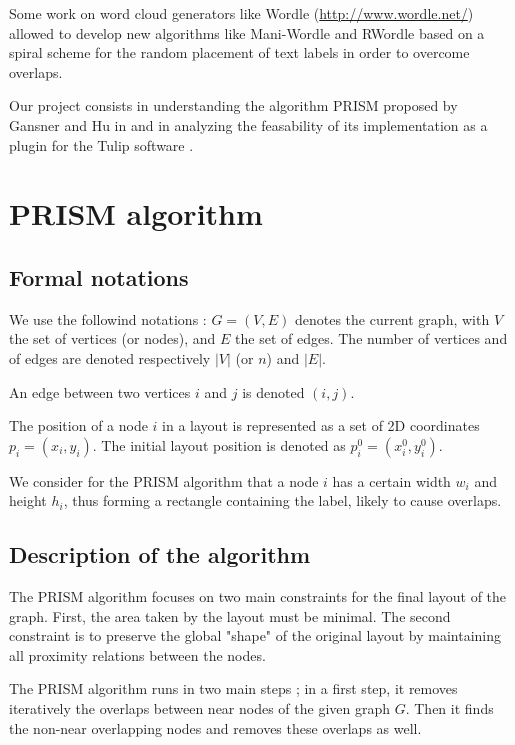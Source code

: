 \documentclass[12pt]{report}
\begin{document}
Some work on word cloud generators like Wordle (\url{http://www.wordle.net/}) allowed to develop new algorithms like Mani-Wordle \cite{Koh10} and RWordle \cite{SSSK12} based on a spiral scheme for the random placement of text labels in order to overcome overlaps.


\bigskip
Our project consists in understanding the algorithm PRISM proposed by Gansner and Hu in \cite{Gansner08} and in analyzing the feasability of its implementation as a plugin for the Tulip software \cite{Auber12}.




\chapter{PRISM algorithm}

\section{Formal notations}

We use the followind notations : $G = (V,E)$ denotes the current graph, with $V$ the set of vertices (or nodes), and $E$ the set of edges. The number of vertices and of edges are denoted respectively $|V|$ (or $n$) and $|E|$.

An edge between two vertices $i$ and $j$ is denoted $(i,j)$.

The position of a node $i$ in a layout is represented as a set of 2D coordinates $p_i = (x_i, y_i)$. The initial layout position is denoted as $p_i^0 = (x_i^0, y_i^0)$.

We consider for the PRISM algorithm that a node $i$ has a certain width $w_i$ and height $h_i$, thus forming a rectangle containing the label, likely to cause overlaps.

\section{Description of the algorithm}

The PRISM algorithm focuses on two main constraints for the final layout of the graph. First, the area taken by the layout must be minimal. The second constraint is to preserve the global "shape" of the original layout by maintaining all proximity relations between the nodes.

The PRISM algorithm runs in two main steps ; in a first step, it removes iteratively the overlaps between near nodes of the given graph $G$. Then it finds the non-near overlapping nodes and removes these overlaps as well.
\end{document}
